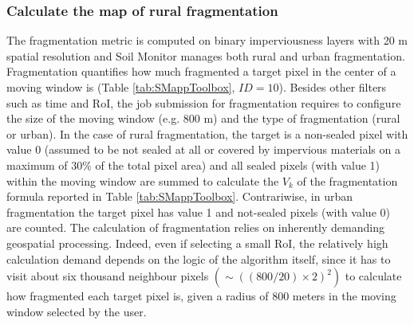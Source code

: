 \documentclass[APA,LATO1COL,doublespace]{WileyNJD-v2}
\begin{document}
\subsubsection{Calculate the map of rural fragmentation}
\label{sec:mmFragmentation}
The fragmentation metric is computed on binary imperviousness layers with 20 m spatial resolution and Soil Monitor manages both rural and urban fragmentation.
Fragmentation quantifies how much fragmented %
a target pixel in the center of a moving window is (Table \ref{tab:SMappToolbox}, $ID = 10$).
Besides other filters such as time and RoI, the job submission for fragmentation requires to configure the size of the moving window (e.g. 800 m) and the type of fragmentation (rural or urban).
In the case of rural fragmentation, the target is a non-sealed pixel with value 0 (assumed to be not sealed at all or covered by impervious materials on a maximum of 30\% of the total pixel area) and all sealed pixels (with value 1) within the moving window are summed to calculate the $V_k$ of the fragmentation formula reported in Table \ref{tab:SMappToolbox}.
Contrariwise, in urban fragmentation the target pixel has value 1 and not-sealed pixels (with value 0) are counted.
The calculation of fragmentation relies on inherently demanding geospatial processing.
Indeed, even if selecting a small RoI, the relatively high calculation demand depends on the logic of the algorithm itself, since it has to visit about six thousand neighbour pixels $\left( \sim \left( \left(800/20\right)\times2 \right)^2 \right)$ to calculate how fragmented each target pixel is, given a radius of 800 meters in the moving window selected by the user.
\end{document}
